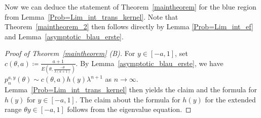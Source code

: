 \documentclass[12pt]{article}
\newcommand{\1}{\mathds{1}}
\theoremstyle{definition}
\theoremstyle{plain}
\theoremstyle{remark}
\begin{document}
Now we can deduce the statement of Theorem~\ref{maintheorem} for the blue region from Lemma~\ref{Prob=Lim_int_trans_kernel}. Note that Theorem~\ref{maintheorem_2} then follows directly by Lemma \ref{Prob=Lim_int_ef} and Lemma~\ref{asymptotic_blau_erste}.
\begin{proof}[Proof of Theorem~\ref{maintheorem} (B)]%
For $y\in[-a,1]$, set $c(\theta,a)\coloneqq \frac{a+1}{E\left(\theta,\frac{-\theta }{\lambda(a+1)}\right)}$. By Lemma~\ref{asymptotic_blau_erste}, we have $p_n^{a,y}(\theta)\sim c(\theta,a)h(y)\lambda^{n+1}$ as $n\to\infty$. Lemma~\ref{Prob=Lim_int_trans_kernel} then yields the claim and the formula for $h(y)$ for $y\in[-a,1]$. The claim about the formula for $h(y)$ for the extended range $\theta y \in [-a,1]$ follows from the eigenvalue equation. 
    \end{proof}
\end{document}
